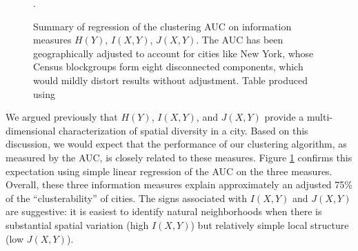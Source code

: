 	\begin{figure}
		\centering
		

		\caption{Summary of regression of the clustering AUC on information measures $H(Y)$, $I(X,Y)$, $J(X,Y)$. The AUC has been geographically adjusted to account for cities like New York, whose Census blockgroups form eight disconnected components, which would mildly distort results without adjustment. Table produced using \cite{Marek2015}}.
		\label{fig:info_and_clusters}
	\end{figure}		

	We argued previously that $H(Y)$, $I(X,Y)$, and $J(X,Y)$ provide a multi-dimensional characterization of spatial diversity in a city. Based on this discussion, we would expect that the performance of our clustering algorithm, as measured by the AUC, is closely related to these measures. Figure \ref{fig:info_and_clusters} confirms this expectation using simple linear regression of the AUC on the three measures. Overall, these three information measures explain approximately an adjusted 75\% of the ``clusterability'' of cities. The signs associated with $I(X,Y)$ and $J(X,Y)$are suggestive: it is easiest to identify natural neighborhoods when there is substantial spatial variation (high $I(X,Y)$) but relatively simple local structure (low $J(X,Y)$). 